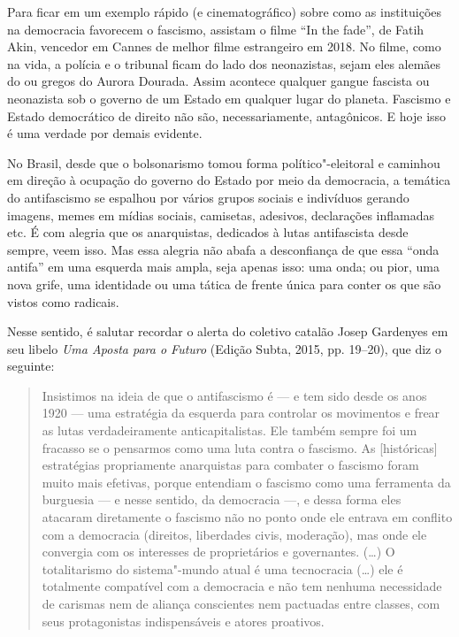 Para ficar em um exemplo rápido (e cinematográfico) sobre como as instituições na democracia favorecem o fascismo, assistam o filme ``In the fade'', de Fatih Akin, vencedor em Cannes de melhor filme estrangeiro em 2018. No filme, como na vida, a polícia e o tribunal ficam do lado dos neonazistas, sejam eles alemães do  ou gregos do Aurora Dourada. Assim acontece qualquer gangue fascista ou neonazista sob o governo de um Estado em qualquer lugar do planeta. Fascismo e Estado democrático de direito não são, necessariamente, antagônicos. E hoje isso é uma verdade por demais evidente.

No Brasil, desde que o bolsonarismo tomou forma político"-eleitoral e caminhou em direção à ocupação do governo do Estado por meio da democracia, a temática do antifascismo se espalhou por vários grupos sociais e indivíduos gerando imagens, memes em mídias sociais, camisetas, adesivos, declarações inflamadas etc. É com alegria que os anarquistas, dedicados à lutas antifascista desde sempre, veem isso. Mas essa alegria não abafa a desconfiança de que essa ``onda antifa'' em uma esquerda mais ampla, seja apenas isso: uma onda; ou pior, uma nova grife, uma identidade ou uma tática de frente única para conter os que são vistos como radicais.

Nesse sentido, é salutar recordar o alerta do coletivo catalão Josep Gardenyes em seu libelo \emph{Uma Aposta para o Futuro} (Edição Subta, 2015, pp. 19--20), que diz o seguinte: 

\begin{quote}
Insistimos na ideia de que o antifascismo é --- e tem sido desde os anos 1920 --- uma estratégia da esquerda para controlar os movimentos e frear as lutas verdadeiramente anticapitalistas. Ele também sempre foi um fracasso se o pensarmos como uma luta contra o fascismo. As [históricas] estratégias propriamente anarquistas para combater o fascismo foram muito mais efetivas, porque entendiam o fascismo como uma ferramenta da burguesia --- e nesse sentido, da democracia ---, e dessa forma eles atacaram diretamente o fascismo não no ponto onde ele entrava em conflito com a democracia (direitos, liberdades civis, moderação), mas onde ele convergia com os interesses de proprietários e governantes. (\ldots{}) O totalitarismo do sistema"-mundo atual é uma tecnocracia (\ldots{}) ele é totalmente compatível com a democracia e não tem nenhuma necessidade de carismas nem de aliança conscientes nem pactuadas entre classes, com seus protagonistas indispensáveis e atores proativos.
\end{quote}

